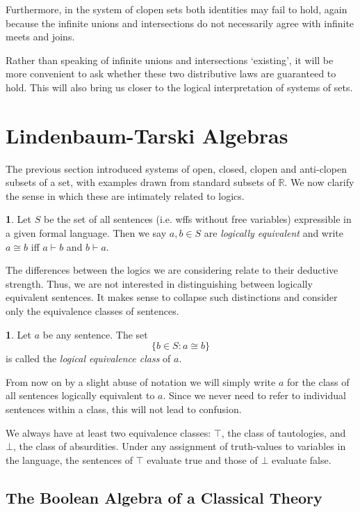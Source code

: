 \documentclass[oneside,english]{article}
\theoremstyle{plain}
\theoremstyle{definition}
\newtheorem{defn}[thm]{\protect\definitionname}
\theoremstyle{definition}
\providecommand{\definitionname}{Definition}
\begin{document}
Furthermore, in the system of clopen sets both identities may fail to hold, again because the infinite unions and intersections do not necessarily agree with infinite meets and joins. 

Rather than speaking of infinite unions and intersections `existing', it will be more convenient to ask whether these two distributive laws are guaranteed to hold. This will also bring us closer to the logical interpretation of systems of sets.

\section{Lindenbaum-Tarski Algebras}

The previous section introduced systems of open, closed, clopen and anti-clopen subsets of a set, with examples drawn from standard subsets of $\mathbb{R}$. We now clarify the sense in which these are intimately related to logics.
\begin{defn}
	Let $S$ be the set of all sentences (i.e. wffs without free variables) expressible in a given formal language. Then we say $a, b\in S$ are \emph{logically equivalent} and write $a\cong b$ iff $a\vdash b$ and $b\vdash a$.
\end{defn}
The differences between the logics we are considering relate to their deductive strength. Thus, we are not interested in distinguishing between logically equivalent sentences. It makes sense to collapse such distinctions and consider only the equivalence classes of sentences. 
\begin{defn}
	Let $a$ be any sentence. The set
	\[
		\{b\in S : a\cong b\}
	\]
	is called the \emph{logical equivalence class} of $a$.
\end{defn}
From now on by a slight abuse of notation we will simply write $a$ for the class of all sentences logically equivalent to $a$. Since we never need to refer to individual sentences within a class, this will not lead to confusion.

We always have at least two equivalence classes: $\top$, the class of tautologies, and $\bot$, the class of absurdities. Under any assignment of truth-values to variables in the language, the sentences of $\top$ evaluate true and those of $\bot$ evaluate false.

\subsection{The Boolean Algebra of a Classical Theory}
\end{document}
